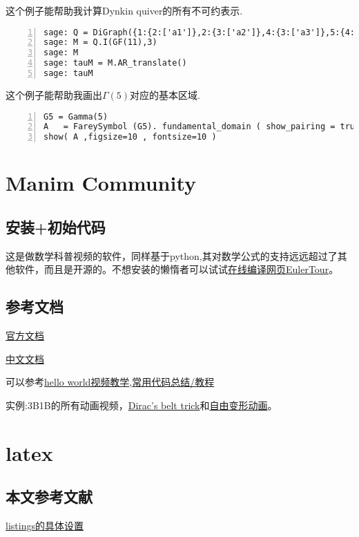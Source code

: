 \documentclass[11pt]{amsart}
\begin{document}
这个例子能帮助我计算Dynkin quiver的所有不可约表示.
\begin{lstlisting}[numbers=left,numberstyle=\tiny,numbersep=10pt]
sage: Q = DiGraph({1:{2:['a1']},2:{3:['a2']},4:{3:['a3']},5:{4:['a4']},6:{3:['a5']}}).path_semigroup()
sage: M = Q.I(GF(11),3)
sage: M
sage: tauM = M.AR_translate()
sage: tauM
\end{lstlisting}

这个例子能帮助我画出$\Gamma(5)$对应的基本区域.
\begin{lstlisting}[numbers=left,numberstyle=\tiny,numbersep=10pt]
G5 = Gamma(5)
A   = FareySymbol (G5). fundamental_domain ( show_pairing = true )
show( A ,figsize=10 , fontsize=10 )
\end{lstlisting}
\section{Manim Community}
\subsection{安装+初始代码}
这是做数学科普视频的软件，同样基于python,其对数学公式的支持远远超过了其他软件，而且是开源的。不想安装的懒惰者可以试试\href{https://eulertour.com/lab}{在线编译网页EulerTour}。
\subsection{参考文档}
\href{https://3b1b.github.io/manim/}{官方文档}

\href{https://docs.manim.org.cn/}{中文文档}

可以参考\href{https://www.bilibili.com/video/BV1KD4y1D7xD}{hello world视频教学},\href{https://www.bilibili.com/video/BV1p54y197cC}{常用代码总结/教程} 

实例:3B1B的所有动画视频，\href{https://www.youtube.com/watch?v=ACZC_XEyg9U&list=PLnQX-jgAF5pTkwtUuVpqS5tuWmJ-6ZM-Z&index=10}{Dirac's belt trick}和\href{https://www.bilibili.com/video/BV1sK4y1V7TE}{自由变形动画}。

\section{latex} 

\subsection{本文参考文献}

 \href{http://blog.sina.com.cn/s/blog_a382a9080102z25i.html}{listings的具体设置}
  
\end{document}
